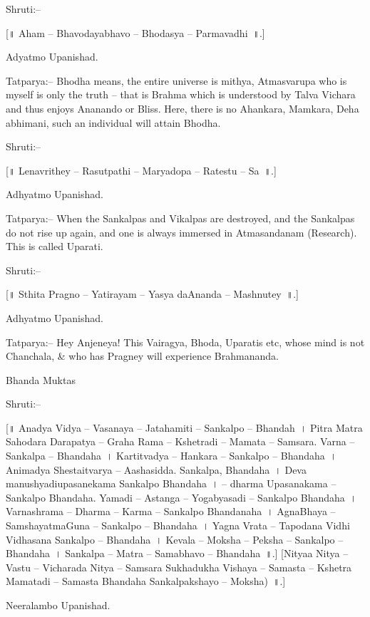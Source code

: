 Shruti:–

[॥ Aham – Bhavodayabhavo – Bhodasya – Parmavadhi~॥.]

Adyatmo Upanishad.

Tatparya:– Bhodha means, the entire universe is mithya, Atmasvarupa who is myself is only the truth – that is Brahma which is understood by Talva Vichara and thus enjoys Ananando or Bliss. Here, there is no Ahankara, Mamkara, Deha abhimani, such an individual will attain Bhodha.

Shruti:–

[॥ Lenavrithey – Rasutpathi – Maryadopa – Ratestu – Sa~॥.]

Adhyatmo Upanishad.

Tatparya:– When the Sankalpas and Vikalpas are destroyed, and the Sankalpas do not rise up again, and one is always immersed in Atmasandanam (Research). This is called Uparati.

Shruti:–

[॥ Sthita Pragno – Yatirayam – Yasya daAnanda – Mashnutey~॥.]

Adhyatmo Upanishad.

Tatparya:– Hey Anjeneya! This Vairagya, Bhoda, Uparatis etc, whose mind is not Chanchala, \& who has Pragney will experience Brahmananda.

Bhanda Muktas

Shruti:–

[॥ Anadya Vidya – Vasanaya – Jatahamiti – Sankalpo – Bhandah~। Pitra Matra Sahodara Darapatya – Graha Rama – Kshetradi – Mamata – Samsara. Varna – Sankalpa – Bhandaha~। Kartitvadya – Hankara – Sankalpo – Bhandaha~। Animadya Shestaitvarya – Aashasidda. Sankalpa, Bhandaha~। Deva manushyadiupasanekama Sankalpo Bhandaha~। – dharma Upasanakama – Sankalpo Bhandaha. Yamadi – Astanga – Yogabyasadi – Sankalpo Bhandaha~। Varnashrama – Dharma – Karma – Sankalpo Bhandanaha~। AgnaBhaya – SamshayatmaGuna – Sankalpo – Bhandaha~। Yagna Vrata – Tapodana Vidhi Vidhasana Sankalpo – Bhandaha~। Kevala – Moksha – Peksha – Sankalpo – Bhandaha~। Sankalpa – Matra – Samabhavo – Bhandaha~॥.] [Nityaa Nitya – Vastu – Vicharada Nitya – Samsara Sukhadukha Vishaya – Samasta – Kshetra Mamatadi – Samasta Bhandaha Sankalpakshayo – Moksha)~॥.]

Neeralambo Upanishad.


